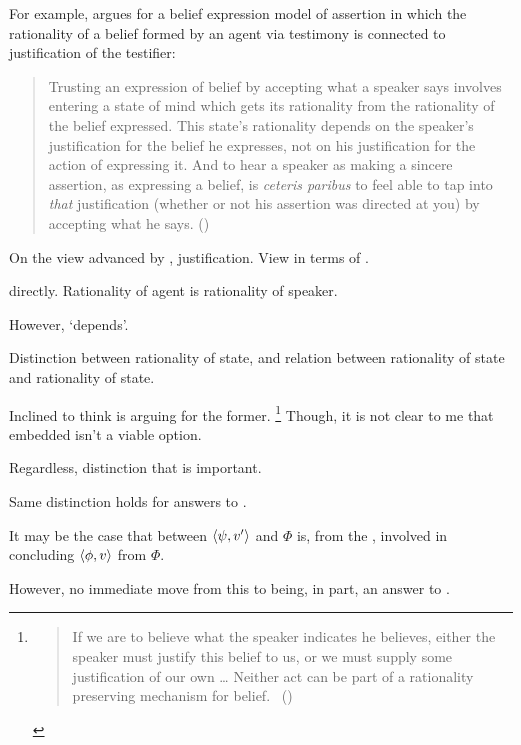 \begin{note}
  For example, \citeauthor{Owens:2006tw} argues for a belief expression model of assertion in which the rationality of a belief formed by an agent via testimony is connected to justification of the testifier:

  \begin{quote}
    Trusting an expression of belief by accepting what a speaker says involves entering a state of mind which gets its rationality from the rationality of the belief expressed.
    This state's rationality depends on the speaker's justification for the belief he expresses, not on his justification for the action of expressing it.
    And to hear a speaker as making a sincere assertion, as expressing a belief, is \emph{ceteris paribus} to feel able to tap into \emph{that} justification (whether or not his assertion was directed at you) by accepting what he says.%
    \mbox{}\hfill\mbox{(\citeyear[123]{Owens:2006tw})}
  \end{quote}

  On the view advanced by \citeauthor{Owens:2006tw}, justification.
  View in terms of \support{}.

  \support{} directly.
  Rationality of agent is rationality of speaker.

  However, `depends'.

  Distinction between rationality of state, and relation between rationality of state and rationality of state.

  Inclined to think \citeauthor{Owens:2006tw} is arguing for the former.%
  \footnote{
    \begin{quote}
      If we are to believe what the speaker indicates he believes, either the speaker must justify this belief to us, or we must supply some justification of our own
      \dots
      Neither act can be part of a rationality preserving mechanism for belief.%
      \mbox{ }\hfill\mbox{(\citeyear[123--124]{Owens:2006tw})}
    \end{quote}
  }
  Though, it is not clear to me that embedded isn't a viable option.

  Regardless, distinction that is important.
\end{note}

\begin{note}
  Same distinction holds for answers to \qWhyV{}.

  It may be the case that \support{} between \(\langle \psi, v' \rangle\) and \(\Phi\) is, from the \agpe{}, involved in concluding \(\langle \phi, v \rangle\) from \(\Phi\).

  However, no immediate move from this to \support{} being, in part, an answer to \qWhyV{}.
\end{note}



